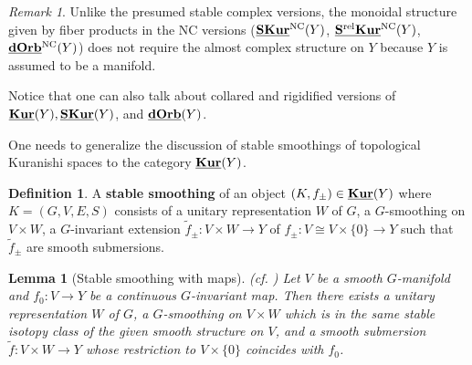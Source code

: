 \documentclass[reqno, 10pt]{amsart}
\numberwithin{equation}{section}
\numberwithin{equation}{section}
\newtheorem{lemma}[thm]{Lemma}
\theoremstyle{definition}
\newtheorem{defn}[thm]{Definition}
\theoremstyle{remark}
\newtheorem{rem}[thm]{Remark}
\newcommand{\uds}[1]{\underline{\smash{#1}}}
\begin{document}
\begin{rem}
Unlike the presumed stable complex versions, the monoidal structure given by fiber products in the NC versions ($\uds{\bf SKur}^{\rm NC}(Y)$, $\uds{\bf S^{\rm rel}Kur}^{\rm NC}(Y)$, $\uds{\bf dOrb}^{\rm NC}(Y)$) does not require the almost complex structure on $Y$ because $Y$ is assumed to be a manifold.
\end{rem}

Notice that one can also talk about collared and rigidified versions of $\uds{\bf Kur}(Y), \uds{\bf SKur}(Y)$, and $\uds{\bf dOrb}(Y)$.

One needs to generalize the discussion of stable smoothings of topological Kuranishi spaces to the category $\uds{\bf Kur}(Y)$.

\begin{defn}
A {\bf stable smoothing} of an object $(K, f_\pm) \in \uds{\bf Kur}(Y)$ where $K = (G, V, E, S)$ consists of a unitary representation $W$ of $G$, a $G$-smoothing on $V \times W$, a $G$-invariant extension $\tilde f_\pm: V \times W \to Y$ of $f_\pm: V \cong V \times \{0\} \to Y$ such that $\tilde f_\pm$ are smooth submersions.
\end{defn}



\begin{lemma}[Stable smoothing with maps] (cf. \cite[Lemma 4.5]{AMS}) \label{lemma_smoothing_map}
Let $V$ be a smooth $G$-manifold and $f_0: V \to Y$ be a continuous $G$-invariant map. Then there exists a unitary representation $W$ of $G$, a $G$-smoothing on $V \times W$ which is in the same stable isotopy class of the given smooth structure on $V$, and a smooth submersion $\tilde f: V \times W \to Y$ whose restriction to $V \times \{0\}$ coincides with $f_0$.
\end{lemma}
\end{document}
